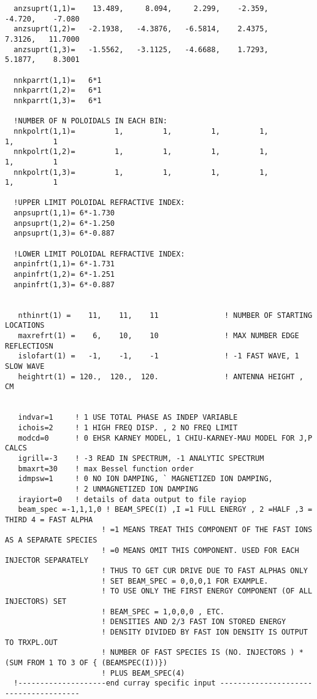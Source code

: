 \begin{verbatim}
  anzsuprt(1,1)=    13.489,     8.094,     2.299,    -2.359,    -4.720,    -7.080
  anzsuprt(1,2)=   -2.1938,   -4.3876,   -6.5814,    2.4375,    7.3126,   11.7000
  anzsuprt(1,3)=   -1.5562,   -3.1125,   -4.6688,    1.7293,    5.1877,    8.3001

  nnkparrt(1,1)=   6*1
  nnkparrt(1,2)=   6*1
  nnkparrt(1,3)=   6*1

  !NUMBER OF N POLOIDALS IN EACH BIN:
  nnkpolrt(1,1)=         1,         1,         1,         1,         1,         1
  nnkpolrt(1,2)=         1,         1,         1,         1,         1,         1
  nnkpolrt(1,3)=         1,         1,         1,         1,         1,         1

  !UPPER LIMIT POLOIDAL REFRACTIVE INDEX:
  anpsuprt(1,1)= 6*-1.730
  anpsuprt(1,2)= 6*-1.250
  anpsuprt(1,3)= 6*-0.887
 
  !LOWER LIMIT POLOIDAL REFRACTIVE INDEX:
  anpinfrt(1,1)= 6*-1.731
  anpinfrt(1,2)= 6*-1.251
  anpinfrt(1,3)= 6*-0.887 


   nthinrt(1) =    11,    11,    11               ! NUMBER OF STARTING LOCATIONS 
   maxrefrt(1) =    6,    10,    10               ! MAX NUMBER EDGE REFLECTIOSN
   islofart(1) =   -1,    -1,    -1               ! -1 FAST WAVE, 1 SLOW WAVE
   heightrt(1) = 120.,  120.,  120.               ! ANTENNA HEIGHT , CM


   indvar=1     ! 1 USE TOTAL PHASE AS INDEP VARIABLE
   ichois=2     ! 1 HIGH FREQ DISP. , 2 NO FREQ LIMIT
   modcd=0      ! 0 EHSR KARNEY MODEL, 1 CHIU-KARNEY-MAU MODEL FOR J,P CALCS
   igrill=-3    ! -3 READ IN SPECTRUM, -1 ANALYTIC SPECTRUM
   bmaxrt=30    ! max Bessel function order
   idmpsw=1     ! 0 NO ION DAMPING, ` MAGNETIZED ION DAMPING,
                ! 2 UNMAGNETIZED ION DAMPING
   irayiort=0   ! details of data output to file rayiop
   beam_spec =-1,1,1,0 ! BEAM_SPEC(I) ,I =1 FULL ENERGY , 2 =HALF ,3 = THIRD 4 = FAST ALPHA
                      ! =1 MEANS TREAT THIS COMPONENT OF THE FAST IONS AS A SEPARATE SPECIES
                      ! =0 MEANS OMIT THIS COMPONENT. USED FOR EACH INJECTOR SEPARATELY
                      ! THUS TO GET CUR DRIVE DUE TO FAST ALPHAS ONLY
                      ! SET BEAM_SPEC = 0,0,0,1 FOR EXAMPLE.
                      ! TO USE ONLY THE FIRST ENERGY COMPONENT (OF ALL INJECTORS) SET
                      ! BEAM_SPEC = 1,0,0,0 , ETC. 
                      ! DENSITIES AND 2/3 FAST ION STORED ENERGY
                      ! DENSITY DIVIDED BY FAST ION DENSITY IS OUTPUT TO TRXPL.OUT
                      ! NUMBER OF FAST SPECIES IS (NO. INJECTORS ) * (SUM FROM 1 TO 3 OF { (BEAMSPEC(I))})
                      ! PLUS BEAM_SPEC(4)
  !--------------------end curray specific input --------------------------------------

\end{verbatim}
